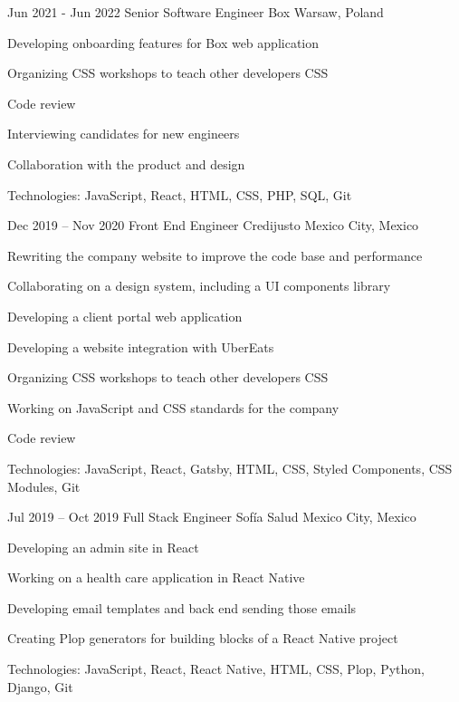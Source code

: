 \begin{sectionlist}
    \sectionlistitemjob
        {Jun 2021 - Jun 2022}
        {Senior Software Engineer}
        {Box}
        {Warsaw, Poland}
        {
            \begin{joblisting}
                \item Developing onboarding features for Box web application
                \item Organizing CSS workshops to teach other developers CSS
                \item Code review
                \item Interviewing candidates for new engineers
                \item Collaboration with the product and design
                \item Technologies: JavaScript, React, HTML, CSS, PHP, SQL, Git
            \end{joblisting}
        }

    \sectionlistitemjob
        {Dec 2019 -- Nov 2020}
        {Front End Engineer}
        {Credijusto}
        {Mexico City, Mexico}
        {
            \begin{joblisting}
                \item Rewriting the company website to improve the code base and
                    performance
                \item Collaborating on a design system, including a UI components library
                \item Developing a client portal web application
                \item Developing a website integration with UberEats
                \item Organizing CSS workshops to teach other developers CSS
                \item Working on JavaScript and CSS standards for the company
                \item Code review
                \item Technologies: JavaScript, React, Gatsby, HTML, CSS,
                    Styled Components, CSS Modules, Git
            \end{joblisting}
        }

    \sectionlistitemjob
        {Jul 2019 -- Oct 2019}
        {Full Stack Engineer}
        {Sofía Salud}
        {Mexico City, Mexico}
        {
            \begin{joblisting}
                \item Developing an admin site in React
                \item Working on a health care application in React Native
                \item Developing email templates and back end sending those emails
                \item Creating Plop generators for building blocks of a React Native project
                \item Technologies: JavaScript, React, React Native,
                    HTML, CSS, Plop, Python, Django, Git
            \end{joblisting}
        }


\end{sectionlist}
